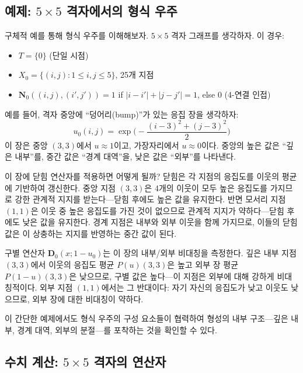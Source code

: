\subsection{예제: $5 \times 5$ 격자에서의 형식 우주}

구체적 예를 통해 형식 우주를 이해해보자. $5 \times 5$ 격자 그래프를 생각하자. 이 경우:

\begin{itemize}
    \item $T = \{0\}$ (단일 시점)
    \item $X_0 = \{(i,j) : 1 \leq i,j \leq 5\}$, 25개 지점
    \item $\mathbf{N}_0((i,j),(i',j')) = 1$ if $|i-i'| + |j-j'| = 1$, else $0$ (4-연결 인접)
\end{itemize}

예를 들어, 격자 중앙에 ``덩어리(bump)''가 있는 응집 장을 생각하자:
\begin{equation}
    u_0(i,j) = \exp\Big(-\frac{(i-3)^2 + (j-3)^2}{2}\Big)
    \label{eq:bump-example}
\end{equation}
이 장은 중앙 $(3,3)$에서 $u \approx 1$이고, 가장자리에서 $u \approx 0$이다. 중앙의 높은 값은 ``깊은 내부''를, 중간 값은 ``경계 대역''을, 낮은 값은 ``외부''를 나타낸다.

이 장에 닫힘 연산자를 적용하면 어떻게 될까? 닫힘은 각 지점의 응집도를 이웃의 평균에 기반하여 갱신한다. 중앙 지점 $(3,3)$은 4개의 이웃이 모두 높은 응집도를 가지므로 강한 관계적 지지를 받는다---닫힘 후에도 높은 값을 유지한다. 반면 모서리 지점 $(1,1)$은 이웃 중 높은 응집도를 가진 것이 없으므로 관계적 지지가 약하다---닫힘 후에도 낮은 값을 유지한다. 경계 지점은 내부와 외부 이웃을 함께 가지므로, 이들의 닫힘 값은 이 상충하는 지지를 반영하는 중간 값이 된다.

구별 연산자 $\mathbf{D}_0(x; 1-u_0)$는 이 장의 내부/외부 비대칭을 측정한다. 깊은 내부 지점 $(3,3)$에서 이웃의 응집도 평균 $P(u)(3,3)$은 높고 외부 장 평균 $P(1-u)(3,3)$은 낮으므로, 구별 값은 높다---이 지점은 외부에 대해 강하게 비대칭적이다. 외부 지점 $(1,1)$에서는 그 반대이다: 자기 자신의 응집도가 낮고 이웃도 낮으므로, 외부 장에 대한 비대칭이 약하다.

이 간단한 예제에서도 형식 우주의 구성 요소들이 협력하여 형성의 내부 구조---깊은 내부, 경계 대역, 외부의 분절---를 포착하는 것을 확인할 수 있다.


\subsection{수치 계산: $5 \times 5$ 격자의 연산자}
\label{sec:5x5-numerical}

